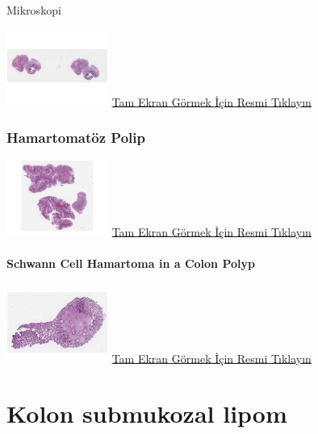 \documentclass[
  letterpaper,
  DIV=11,
  numbers=noendperiod]{scrreprt}
\begin{document}
Mikroskopi

\href{https://images.patolojiatlasi.com/hyperplasticpolyp/case1.html}{\includegraphics[width=0.25\textwidth,height=\textheight]{./screenshots/hyperplasticpolyp-1_screenshot.png}}
\href{https://images.patolojiatlasi.com/hyperplasticpolyp/case1.html}{Tam
Ekran Görmek İçin Resmi Tıklayın}

\hypertarget{sec-kolon-hamartomatoz-polip}{%
\subsection{Hamartomatöz Polip}\label{sec-kolon-hamartomatoz-polip}}

\href{https://images.patolojiatlasi.com/hamartomatouspolyp/HE.html}{\includegraphics[width=0.25\textwidth,height=\textheight]{./screenshots/hamartomatouspolyp_screenshot.png}}
\href{https://images.patolojiatlasi.com/hamartomatouspolyp/HE.html}{Tam
Ekran Görmek İçin Resmi Tıklayın}

\hypertarget{sec-colon-schwann-cell-hamartoma}{%
\subsubsection{Schwann Cell Hamartoma in a Colon
Polyp}\label{sec-colon-schwann-cell-hamartoma}}

\href{https://images.patolojiatlasi.com/schwanncellhamartoma/HE.html}{\includegraphics[width=0.25\textwidth,height=\textheight]{./screenshots/schwanncellhamartoma_screenshot.png}}
\href{https://images.patolojiatlasi.com/schwanncellhamartoma/HE.html}{Tam
Ekran Görmek İçin Resmi Tıklayın}

\hypertarget{sec-kolon-intramukozal-lipom}{%
\chapter{Kolon submukozal lipom}\label{sec-kolon-intramukozal-lipom}}
\end{document}
